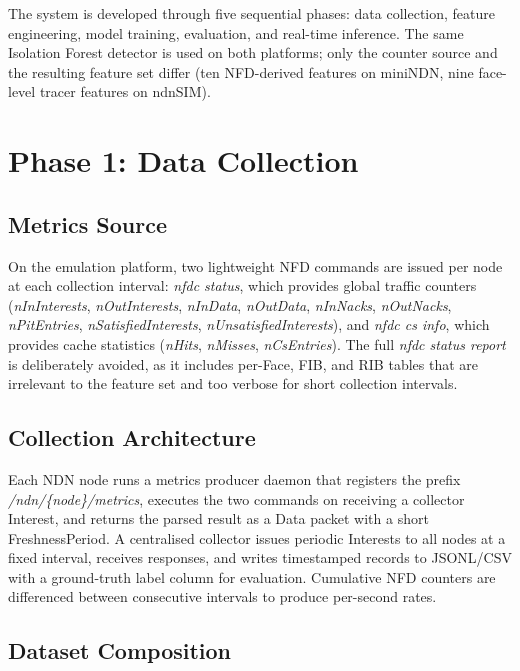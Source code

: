 \documentclass[12pt]{report}
\begin{document}
The system is developed through five sequential phases: data collection, feature engineering, model training, evaluation, and real-time inference. The same Isolation Forest detector is used on both platforms; only the counter source and the resulting feature set differ (ten NFD-derived features on miniNDN, nine face-level tracer features on ndnSIM).

\section{Phase 1: Data Collection}

\subsection{Metrics Source}

On the emulation platform, two lightweight NFD commands are issued per node at each collection interval: \textit{nfdc status}, which provides global traffic counters (\textit{nInInterests}, \textit{nOutInterests}, \textit{nInData}, \textit{nOutData}, \textit{nInNacks}, \textit{nOutNacks}, \textit{nPitEntries}, \textit{nSatisfiedInterests}, \textit{nUnsatisfiedInterests}), and \textit{nfdc cs info}, which provides cache statistics (\textit{nHits}, \textit{nMisses}, \textit{nCsEntries}). The full \textit{nfdc status report} is deliberately avoided, as it includes per-Face, FIB, and RIB tables that are irrelevant to the feature set and too verbose for short collection intervals.

\subsection{Collection Architecture}

Each NDN node runs a metrics producer daemon that registers the prefix \textit{/ndn/\{node\}/metrics}, executes the two commands on receiving a collector Interest, and returns the parsed result as a Data packet with a short FreshnessPeriod. A centralised collector issues periodic Interests to all nodes at a fixed interval, receives responses, and writes timestamped records to JSONL/CSV with a ground-truth label column for evaluation. Cumulative NFD counters are differenced between consecutive intervals to produce per-second rates.

\subsection{Dataset Composition}
\end{document}
